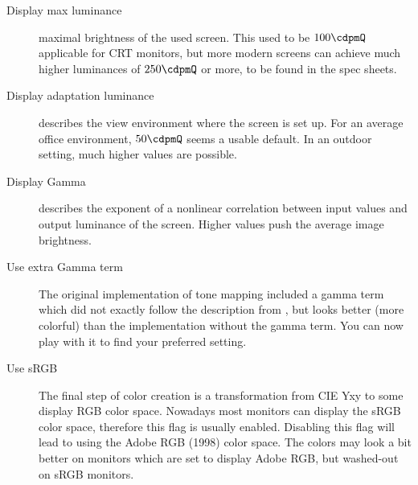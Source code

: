 \begin{description}
\item[Display max luminance] maximal brightness of the used
  screen. This used to be $100 \cdpmQ$ applicable for CRT monitors,
  but more modern screens can achieve much higher luminances of
  $250 \cdpmQ$ or more, to be found in the spec sheets.
\item[Display adaptation luminance] describes the view environment
  where the screen is set up. For an average office environment,
  $50 \cdpmQ$ seems a usable default. In an outdoor setting, much
  higher values are possible.
\item[Display Gamma] describes the exponent of a nonlinear correlation
  between input values and output luminance of the screen. Higher
  values push the average image brightness.
\item[Use extra Gamma term] The original implementation of tone mapping
  included a gamma term which did not exactly follow the description
  from \citet{Larson:1997}, but looks better (more colorful) than the
  implementation without the gamma term. You can now play with it to
  find your preferred setting.
\item[Use sRGB] The final step of color creation is a transformation
  from CIE Yxy to some display RGB color space. Nowadays most monitors
  can display the sRGB color space, therefore this flag is usually
  enabled. Disabling this flag will lead to using the Adobe RGB
  (1998) color space. The colors may look a bit better on monitors
  which are set to display Adobe RGB, but washed-out on sRGB monitors.
\end{description}



